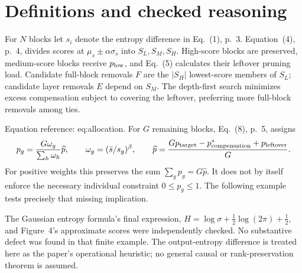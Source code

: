 \documentclass[10pt]{article}
\begin{document}
\section*{Definitions and checked reasoning}
For \(N\) blocks let \(s_i\) denote the entropy difference in Eq. (1), p. 3. Equation (4), p. 4, divides scores at \(\mu_s\pm\alpha\sigma_s\) into \(S_L,S_M,S_H\). High-score blocks are preserved, medium-score blocks receive \(p_{\rm low}\), and Eq. (5) calculates their leftover pruning load. Candidate full-block removals \(F\) are the \(|S_H|\) lowest-score members of \(S_L\); candidate layer removals \(E\) depend on \(S_M\). The depth-first search minimizes excess compensation subject to covering the leftover, preferring more full-block removals among ties.\par
Equation reference: eq:allocation. For \(G\) remaining blocks, Eq. (8), p. 5, assigns \[p_g=\frac{G\omega_g}{\sum_h\omega_h}\widehat p,\qquad
 \omega_g=(\bar s/s_g)^\beta,\qquad
 \widehat p=\frac{G p_{\rm target}-p_{\rm compensation}^{*}+p_{\rm leftover}}{G}.
 \] For positive weights this preserves the sum \(\sum_g p_g=G\widehat p\). It does not by itself enforce the necessary individual constraint \(0\leq p_g\leq1\). The following example tests precisely that missing implication.\par
The Gaussian entropy formula’s final expression, \(H=\log\sigma+\tfrac12\log(2\pi)+\tfrac12\), and Figure 4’s approximate scores were independently checked. No substantive defect was found in that finite example. The output-entropy difference is treated here as the paper’s operational heuristic; no general causal or rank-preservation theorem is assumed.\par
\end{document}
